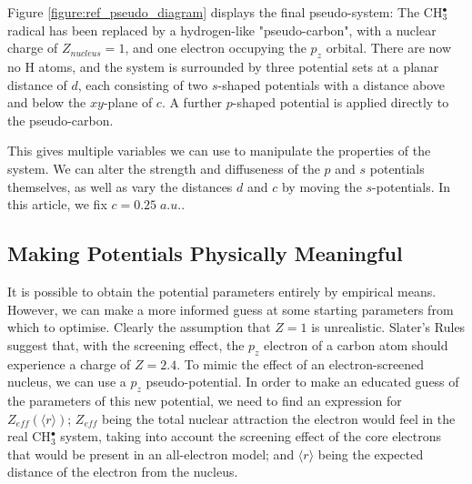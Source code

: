 \documentclass[journal=jctcce,manuscript=article]{achemso}
\begin{document}
Figure \ref{figure:ref_pseudo_diagram} displays the final pseudo-system: The CH\(^{\bullet}_{3}\) radical has been replaced by
a hydrogen-like "pseudo-carbon", with a nuclear charge of \(Z_{nucleus} = 1\), and one electron occupying the \(p_{z}\) orbital. 
There are now no H atoms, and the system is surrounded by three potential sets at a planar distance of \(d\), each consisting of 
two \(s\)-shaped potentials with a distance above and below the \(xy\)-plane of \(c\). A further \(p\)-shaped potential is applied
directly to the pseudo-carbon.

This gives multiple variables we can use to manipulate the properties of the system.
We can alter the strength and diffuseness of the \(p\) and \(s\) potentials themselves,
as well as vary the distances \(d\) and \(c\) by moving the \(s\)-potentials.
In this article, we fix \(c = 0.25\;a.u.\).

\subsection{Making Potentials Physically Meaningful}
\label{section:potential_derivation}

It is possible to obtain the potential parameters entirely by empirical means. However, we can make a more informed guess at some starting parameters from which to optimise. Clearly the assumption that \(Z = 1\) is unrealistic. Slater's Rules\cite{slatersrules} suggest that, with the screening effect, the \(p_{z}\) electron of a carbon atom should experience a charge of \(Z = 2.4\). To mimic the effect of an electron-screened nucleus, we can use a \(p_{z}\) pseudo-potential. In order to make an educated guess of the parameters of this new potential, we need to find an expression for \(Z_{eff}(\langle r \rangle)\); \(Z_{eff}\) being the total nuclear attraction the electron would feel in the real CH\(^{\bullet}_{3}\) system, taking into account the screening effect of the core electrons that would be present in an all-electron model; and \( \langle r \rangle \) being the expected distance of the electron from the nucleus.
\end{document}

